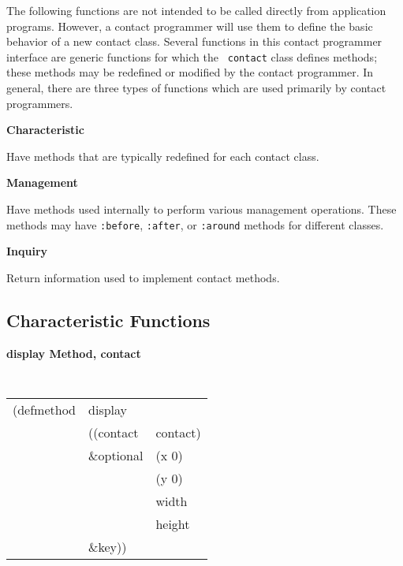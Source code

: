 The following functions are
not intended to be called directly
from application programs. However, a contact programmer will  use them to
define the basic behavior of a new contact
class.  
Several functions in this contact programmer interface are generic functions for
which the {\tt
contact} class defines methods; these methods may be redefined or modified by the
contact programmer. In general, there are three types of functions  which
are used primarily by contact programmers.

\begin{center}
\parbox[t]{1in}{{\bf Characteristic}} \hspace{.125in} \parbox[t]{4in}{Have
methods that are typically redefined for each contact class.} 

\parbox[t]{1in}{{\bf Management}} \hspace{.125in} \parbox[t]{4in}{Have methods
used
internally to perform various management operations. These methods  may have
{\tt :before}, {\tt :after}, or {\tt :around} methods for different classes.} 

\parbox[t]{1in}{{\bf Inquiry}} \hspace{.125in} \parbox[t]{4in}{Return
information used to implement contact methods.} 
\end{center}

{\samepage
\subsection*{Characteristic Functions}

{\large {\bf display \hfill Method, contact}}
\begin{flushright}
\parbox[t]{6.125in}{
\tt
\begin{tabular}{lll}
\raggedright
(defmethod & display & \\
& ((contact  &contact)\\
& \&optional & (x 0)\\
& & (y 0)\\
& & width \\
& & height\\
& \&key))
\end{tabular}}\end{flushright}
}

